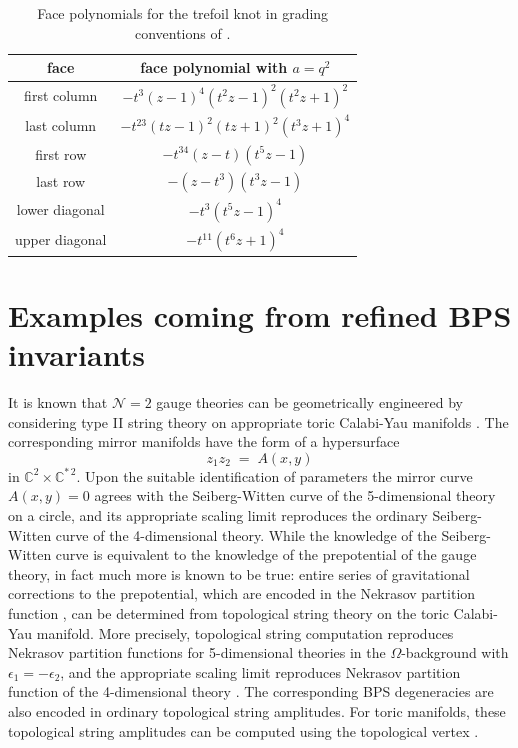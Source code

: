 \documentclass[hyper,letterpaper]{JHEP3}
\newcommand{\be}{\begin{equation}}
\newcommand{\ee}{\end{equation}}
\newcommand{\C}{{\mathbb C}}
\begin{document}
\begin{table}[ht]
\centering
\begin{tabular}{| c || c | }
\hline
\rule{0pt}{5mm}
face & face polynomial with $a=q^2$ \\[3pt]
\hline
\rule{0pt}{5mm}
first column & $-t^3 (z - 1)^4 (t^2 z - 1)^2 (t^2 z + 1)^2$ \\[3pt]
last column & $-t^{23} (t z - 1)^2 (t z + 1)^2 (t^3 z + 1)^4$ \\[3pt]
first row & $-t^{34} (z - t) (t^5 z - 1)$ \\[3pt]
last row & $-(z - t^3) (t^3 z - 1)$ \\[3pt]
lower diagonal & $-t^3 (t^5 z - 1)^4$ \\[3pt]
upper diagonal & $-t^{11} (t^6 z + 1)^4$ \\[3pt]
\hline
\end{tabular}
\caption{Face polynomials for the trefoil knot in grading conventions of \cite{DGR}.}  \label{tab-dgr}
\end{table}




\section{Examples coming from refined BPS invariants}
\label{sec:Bmodel}

It is known that $\mathcal{N}=2$ gauge theories can be geometrically engineered by considering
type II string theory on appropriate toric Calabi-Yau manifolds \cite{engineering}.
The corresponding mirror manifolds have the form of a hypersurface
\be
z_1 z_2 \; = \; A(x,y)    \label{Amirror}
\ee
in $\C^2 \times \C^{*\, 2}$. Upon the suitable identification of parameters
the mirror curve $A(x,y)=0$ agrees with the Seiberg-Witten curve of the 5-dimensional theory on a circle,
and its appropriate scaling limit reproduces the ordinary Seiberg-Witten curve of the 4-dimensional theory.
While the knowledge of the Seiberg-Witten curve is equivalent to the knowledge of the prepotential of the gauge theory,
in fact much more is known to be true: entire series of gravitational corrections to the prepotential,
which are encoded in the Nekrasov partition function \cite{Nekrasov},
can be determined from topological string theory on the toric Calabi-Yau manifold.
More precisely, topological string computation reproduces Nekrasov partition functions
for 5-dimensional theories in the $\Omega$-background with $\epsilon_1 = - \epsilon_2$,
and the appropriate scaling limit reproduces Nekrasov partition function of the 4-dimensional theory \cite{Iqbal:2003zz}.
The corresponding BPS degeneracies are also encoded in ordinary topological string amplitudes.
For toric manifolds, these topological string amplitudes can be computed using the topological vertex \cite{AKMV}.
\end{document}
